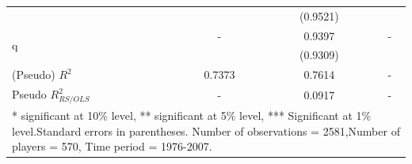 \documentclass[12pt]{article}
\begin{document}
\begin{table}
\begin{center}
\begin{tabular}{l|c|cc|c}
 & & \multicolumn{2}{c|}{(0.9521)} & \\ [0.4pc] 
\multirow{2}{*}{q} & - & \multicolumn{2}{c|}{0.9397} & - \\ 
 & & \multicolumn{2}{c|}{(0.9309)} & \\ \hline 
(Pseudo) $R^2$ & 0.7373 & \multicolumn{2}{c|}{0.7614} & - \\ 
Pseudo $R_{RS/OLS}^2$ & - & \multicolumn{2}{c|}{0.0917} & - \\ \hline
\multicolumn{5}{p{5in}}{\footnotesize{* significant at 10\% level, ** significant at 5\% level, *** Significant at 1\% level.\newline Standard errors in parentheses.  Number of observations = 2581,\newline Number of players = 570, Time period = 1976-2007.}}
\end{tabular}
\end{center}
\end{table}
\end{document}
